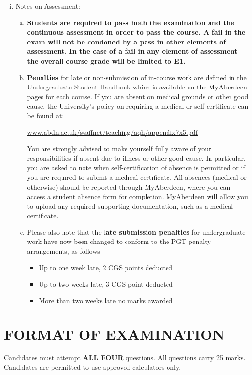 \documentclass[12pts,a4paper,amsmath,amssymb,floatfix]{article}%
\begin{document}
\begin{enumerate}[(i)]
   \item Notes on Assessment:
   \begin{enumerate}[(a)]
      \item {\bf Students are required to pass both the examination and the continuous assessment in order to pass the course. A fail in the exam will not be condoned by a pass in other elements of assessment. In the case of a fail in any element of assessment the overall course grade will be limited to E1.}
      \item {\bf Penalties} for late or non-submission of in-course work are defined in the Undergraduate Student Handbook which is available on the MyAberdeen pages for each course. If you are absent on medical grounds or other good cause, the University's policy on requiring a medical or self-certificate can be found at:
      \begin{center}
         \href{www.abdn.ac.uk/staffnet/teaching/aqh/appendix7x5.pdf}{www.abdn.ac.uk/staffnet/teaching/aqh/appendix7x5.pdf}
      \end{center}
      You are strongly advised to make yourself fully aware of your responsibilities if absent due to illness or other good cause. In particular, you are asked to note when self-certification of absence is permitted or if you are required to submit a medical certificate. All absences (medical or otherwise) should be reported through MyAberdeen, where you can access a student absence form for completion. MyAberdeen will allow you to upload any required supporting documentation, such as a medical certificate. 
     \item Please also note that the {\bf late submission penalties} for undergraduate work have now been changed to conform to the PGT penalty arrangements, as follows
     \begin{itemize}
        \item Up to one week late, 2 CGS points deducted
        \item Up to two weeks late, 3 CGS point deducted
        \item More than two weeks late no marks awarded
     \end{itemize}
      
   \end{enumerate}

\end{enumerate}


\section{FORMAT OF EXAMINATION}
Candidates must attempt {\bf ALL FOUR} questions. All questions carry 25 marks. Candidates are permitted to use approved calculators only.
\end{document}
